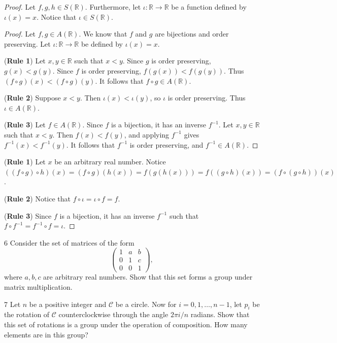 \begin{proof}
Let $f, g, h \in S(\mathbb{R})$.
Furthermore, let $\iota : \mathbb{R} \longrightarrow \mathbb{R}$ be a function
defined by $\iota(x) = x$.
Notice that $\iota \in S(\mathbb{R})$.

\begin{proof}
    Let $f, g \in A(\mathbb{R})$.
    We know that $f$ and $g$ are bijections and order preserving.
    Let $\iota : \mathbb{R} \to \mathbb{R}$ be defined by $\iota(x)=x$.

    (\textbf{Rule 1})
    Let $x,y \in \mathbb{R}$ such that $x < y$.
    Since $g$ is order preserving, $g(x) < g(y)$.
    Since $f$ is order preserving, $f(g(x)) < f(g(y))$.
    Thus $(f \circ g)(x) < (f \circ g)(y)$.
    It follows that $f \circ g \in A(\mathbb{R})$.

    (\textbf{Rule 2})
    Suppose $x<y$. Then $\iota(x)<\iota(y)$, so $\iota$ is order preserving.
    Thus $\iota \in A(\mathbb{R})$.

    (\textbf{Rule 3})
    Let $f \in A(\mathbb{R})$.
    Since $f$ is a bijection, it has an inverse $f^{-1}$.
    Let $x,y \in \mathbb{R}$ such that $x<y$.
    Then $f(x) < f(y)$, and applying $f^{-1}$ gives
    $f^{-1}(x) < f^{-1}(y)$.
    It follows that $f^{-1}$ is order preserving, and $f^{-1} \in A(\mathbb{R})$.
\end{proof}


(\textbf{Rule 1})
    Let $x$ be an arbitrary real number.
    Notice $
    ((f \circ g) \circ h)(x)
    = (f \circ g)(h(x))
    = f(g(h(x)))
    = f((g \circ h)(x))
    = (f \circ (g \circ h))(x)$.

    (\textbf{Rule 2})
    Notice that $f \circ \iota = \iota \circ f = f$.

    (\textbf{Rule 3})
    Since $f$ is a bijection, it has an inverse $f^{-1}$ such that
    $f \circ f^{-1} = f^{-1} \circ f = \iota$.
\end{proof}

\begin{problem}{6}
    Consider the set of matrices of the form
    \[\begin{pmatrix} 1 & a & b \\ 0 & 1 & c \\ 0 & 0 & 1 \end{pmatrix},\]
    where $a, b, c$ are arbitrary real numbers. Show that this set forms a group under
    matrix multiplication.
\end{problem}
\unsolved

\begin{problem}{7}
    Let $n$ be a positive integer and $\mathcal{C}$ be a circle.
    Now for $i = 0, 1, \ldots, n - 1$, let $p_i$ be the rotation of 
    $\mathcal{C}$ counterclockwise through the angle 
    $2 \pi i / n$ radians. Show that this set of rotations is a group 
    under the operation of composition. How many elements are in this group?
\end{problem}
\solved

